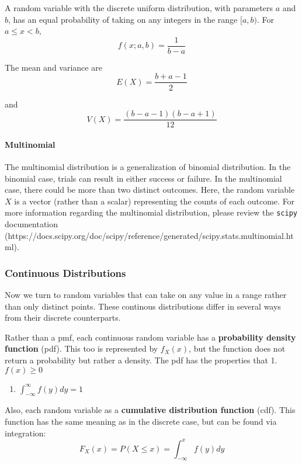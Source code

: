 \documentclass[11pt]{article}
\providecommand{\tightlist}{%
      \setlength{\itemsep}{0pt}\setlength{\parskip}{0pt}}
\begin{document}
A random variable with the discrete uniform distribution, with
parameters \(a\) and \(b\), has an equal probability of taking on any
integers in the range \([a,b)\). For \(a\leq x < b\), \[
f(x;a,b)= \frac{1}{b-a}
\]

The mean and variance are \[
E(X) = \frac{b+a-1}{2}
\]

and \[
V(X) = \frac{(b-a-1)(b-a+1)}{12}
\]

    \paragraph{Multinomial}\label{multinomial}

The multinomial distribution is a generalization of binomial
distribution. In the binomial case, trials can result in either success
or failure. In the multinomial case, there could be more than two
distinct outcomes. Here, the random variable \(X\) is a vector (rather
than a scalar) representing the counts of each outcome. For more
information regarding the multinomial distribution, please review the
\texttt{scipy} documentation
(https://docs.scipy.org/doc/scipy/reference/generated/scipy.stats.multinomial.html).

    \subsubsection{Continuous Distributions}\label{continuous-distributions}

    Now we turn to random variables that can take on any value in a range
rather than only distinct points. These continous distributions differ
in several ways from their discrete counterparts.

Rather than a pmf, each continuous random variable has a
\textbf{probability density function} (pdf). This too is represented by
\(f_X(x)\), but the function does not return a probability but rather a
density. The pdf has the properties that 1. \(f(x) \geq 0\)

\begin{enumerate}
\def\labelenumi{\arabic{enumi}.}
\setcounter{enumi}{1}
\tightlist
\item
  \(\int_{-\infty}^{\infty} f(y) dy = 1\)
\end{enumerate}

Also, each random variable as a \textbf{cumulative distribution
function} (cdf). This function has the same meaning as in the discrete
case, but can be found via integration:\\
\[ F_{X}(x) = P(X \leq x) = \int_{-\infty}^x f(y)dy \]
\end{document}
